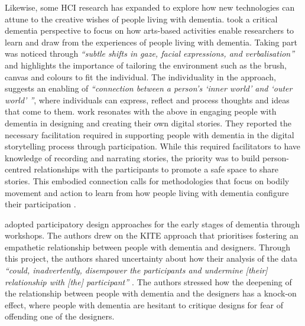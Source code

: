 Likewise, some HCI research has expanded to explore how new technologies can attune to the creative wishes of people living with dementia. \cite{lazar_critical_2017} took a critical dementia perspective to focus on how arts-based activities enable researchers to learn and draw from the experiences of people living with dementia. Taking part was noticed through \textit{``subtle shifts in gaze, facial expressions, and verbalisation''} and highlights the importance of tailoring the environment such as the brush, canvas and colours to fit the individual. The individuality in the approach, suggests an enabling of \textit{``connection between a person's `inner world' and `outer world' ''}, where individuals can express, reflect and process thoughts and ideas that come to them. \cite{stenhouse2013dangling} work resonates with the above in engaging people with dementia in designing and creating their own digital stories. They reported the necessary facilitation required in supporting people with dementia in the digital storytelling process through participation. While this required facilitators to have knowledge of recording and narrating stories, the priority was to build person-centred relationships with the participants to promote a safe space to share stories. This embodied connection calls for methodologies that focus on bodily movement and action to learn from how people living with dementia configure their participation \citep{morrissey_creative_2015}.

\cite{lindsay_empathy_2012} adopted participatory design approaches for the early stages of dementia through workshops. The authors drew on the KITE approach that prioritises fostering an empathetic relationship between people with dementia and designers. Through this project, the authors shared uncertainty about how their analysis of the data  \textit{``could, inadvertently, disempower the participants and undermine [their] relationship with [the] participant'' \citep[p.528]{lindsay_empathy_2012}}. The authors stressed how the deepening of the relationship between people with dementia and the designers has a knock-on effect, where people with dementia are hesitant to critique designs for fear of offending one of the designers.

